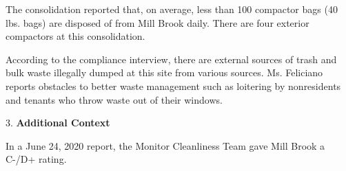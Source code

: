 The consolidation reported that, on average, less than 100 compactor bags (40 lbs. bags) are disposed of from Mill Brook daily. There are four exterior compactors at this consolidation.

According to the compliance interview, there are external sources of trash and bulk waste illegally dumped at this site from various sources. Ms. Feliciano reports obstacles to better waste management such as loitering by nonresidents and tenants who throw waste out of their windows.

3. \textbf{Additional Context}

In a June 24, 2020 report, the Monitor Cleanliness Team gave Mill Brook a C-/D+ rating. 